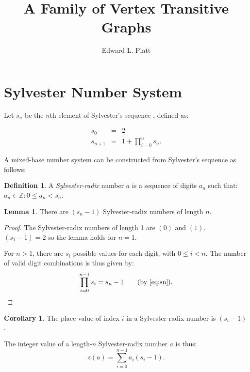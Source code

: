 \documentclass{article}
\title{A Family of Vertex Transitive Graphs}
\author{Edward L. Platt}
\theoremstyle{definition}
\newtheorem{definition}{Definition}[section]
\newtheorem{lemma}{Lemma}
\newtheorem{corollary}{Corollary}
\begin{document}
\maketitle

\section{Sylvester Number System}

Let $s_n$ be the $n$th element of Sylvester's sequence \cite{sylvester1880point}, defined as:

\begin{eqnarray}
s_0 &=& 2 \\
s_{n + 1} &=& 1 + \prod_{i=0}^n s_n. \label{eq:sn}
\end{eqnarray}

A mixed-base number system can be constructed from Sylvester's sequence as follows:
\begin{definition}
A {\em Sylvester-radix} number $a$ is a sequence of digits $a_n$ such that: $a_n \in \mathbb{Z} : 0 \le a_n < s_n$.
\end{definition}

\begin{lemma}
There are $(s_n - 1)$ Sylvester-radix numbers of length $n$.
\end{lemma}

\begin{proof}
The Sylvester-radix numbers of length 1 are $(0)$ and $(1)$. $(s_1 - 1) = 2$ so the lemma holds for $n=1$.

For $n > 1$, there are $s_i$ possible values for each digit, with $0 \le i < n$. The number of valid digit combinations is thus given by:
\begin{equation*}
\prod_{i=0}^{n-1} s_i = s_n - 1 \qquad \text{(by \eqref{eq:sn})}.
\end{equation*}
\end{proof}

\begin{corollary}
The place value of index $i$ in a Sylvester-radix number is $(s_i - 1)$.
\end{corollary}

The integer value of a length-$n$ Sylvester-radix number $a$ is thus:
\begin{equation}
z(a) = \sum_{i=0}^{n-1} a_i (s_i - 1).
\end{equation}



\end{document}
